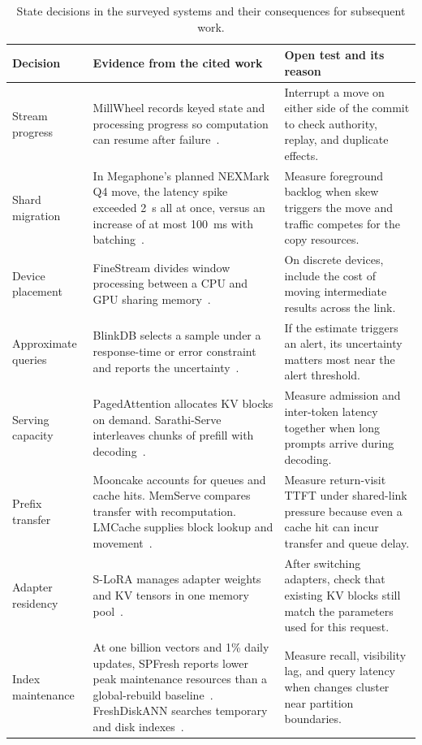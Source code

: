 \documentclass[manuscript]{acmart}
\begin{document}
\begin{table}[t]
\small
\centering
\setlength{\tabcolsep}{3pt}
\caption{State decisions in the surveyed systems and their consequences for subsequent work.}
\label{tab:representative-mechanism-matrix}
\begin{tabular}{@{}p{}p{}p{}@{}}
\toprule
Decision & Evidence from the cited work & Open test and its reason \\
\midrule
Stream progress & MillWheel records keyed state and processing progress so computation can resume after failure~\cite{akidau2013millwheel}. & Interrupt a move on either side of the commit to check authority, replay, and duplicate effects. \\
Shard migration & In Megaphone's planned NEXMark Q4 move, the latency spike exceeded 2~s all at once, versus an increase of at most 100~ms with batching~\cite[Figure~8]{nasir2019megaphone}. & Measure foreground backlog when skew triggers the move and traffic competes for the copy resources. \\
Device placement & FineStream divides window processing between a CPU and GPU sharing memory~\cite{zhang2020finestream}. & On discrete devices, include the cost of moving intermediate results across the link. \\
Approximate queries & BlinkDB selects a sample under a response-time or error constraint and reports the uncertainty~\cite{agarwal2013blinkdb}. & If the estimate triggers an alert, its uncertainty matters most near the alert threshold. \\
Serving capacity & PagedAttention allocates KV blocks on demand. Sarathi-Serve interleaves chunks of prefill with decoding~\cite{kwon2023pagedattention,agrawal2024sarathi}. & Measure admission and inter-token latency together when long prompts arrive during decoding. \\
Prefix transfer & Mooncake accounts for queues and cache hits. MemServe compares transfer with recomputation. LMCache supplies block lookup and movement~\cite{qin2025mooncake,hu2024memserve,liu2025lmcache}. & Measure return-visit TTFT under shared-link pressure because even a cache hit can incur transfer and queue delay. \\
Adapter residency & S-LoRA manages adapter weights and KV tensors in one memory pool~\cite{sheng2023slora}. & After switching adapters, check that existing KV blocks still match the parameters used for this request. \\
Index maintenance & At one billion vectors and 1\% daily updates, SPFresh reports lower peak maintenance resources than a global-rebuild baseline~\cite{xu2023spfresh}. FreshDiskANN searches temporary and disk indexes~\cite{singh2021freshdiskann}. & Measure recall, visibility lag, and query latency when changes cluster near partition boundaries. \\

\end{tabular}
\end{table}
\end{document}
